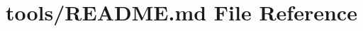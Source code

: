 \hypertarget{tools_2README_8md}{\section{tools/\+R\+E\+A\+D\+M\+E.md File Reference}
\label{tools_2README_8md}
}
